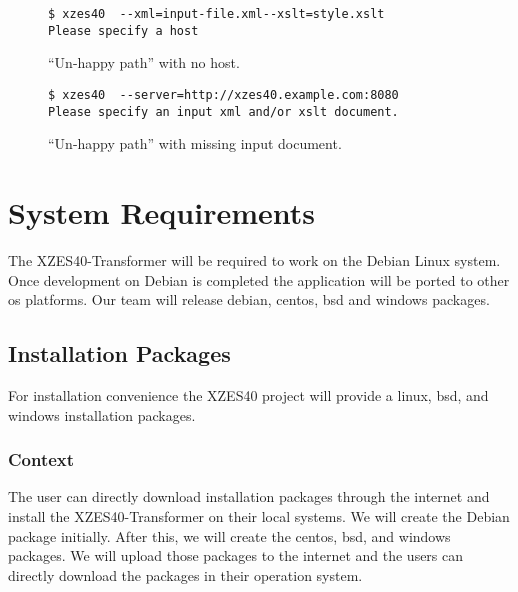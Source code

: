 \begin{figure}
\begin{lstlisting}
$ xzes40  --xml=input-file.xml--xslt=style.xslt
Please specify a host
\end{lstlisting}
\caption{``Un-happy path'' with no host.}
\end{figure}

\begin{figure}
\begin{lstlisting}
$ xzes40  --server=http://xzes40.example.com:8080
Please specify an input xml and/or xslt document.
\end{lstlisting}
\caption{``Un-happy path'' with missing input document.}
\end{figure}

\section{System Requirements}
\label{system-requirements}

The XZES40-Transformer will be required to work on the Debian Linux system.
Once development on Debian is completed the application will be ported to other \gls{os} platforms.
Our team will release \gls{debian}, \gls{centos}, \gls{bsd} and \gls{windows} packages.
  
\subsection{Installation Packages}
\label{installation-packages}

For installation convenience the XZES40 project will provide a \gls{linux}, \gls{bsd}, and \gls{windows} installation packages.

\subsubsection{Context}

The user can directly download installation packages through the internet and install the XZES40-Transformer on their local systems.
We will create the Debian package initially.
After this, we will create the \gls{centos}, \gls{bsd}, and \gls{windows} packages.
We will upload those packages to the internet and the users can directly download the packages in their operation system.

